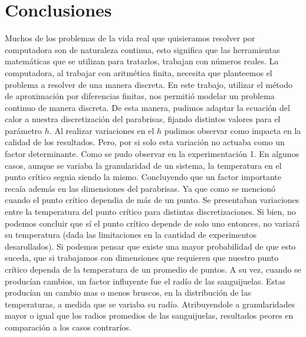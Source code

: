 \section{Conclusiones}
Muchos de los problemas de la vida real que quisieramos resolver por computadora son de naturaleza continua, esto significa que las herramientas matemáticas que se utilizan para tratarlos, trabajan con números reales. La computadora, al trabajar con aritmética finita, necesita que planteemos el problema a resolver de una manera discreta. En este trabajo, utilizar el método de aproximación por diferencias finitas, nos permitió modelar un problema continuo de manera discreta. De esta manera, pudimos adaptar la ecuación del calor a nuestra discretización del parabrisas, fijando distintos valores para el parámetro $h$.\newline
Al realizar variaciones en el $h$ pudimos observar como impacta en la calidad de los resultados. Pero, por si solo esta variación no actuaba como un factor determinante. Como se pudo observar en la experimentación 1. En algunos casos, aunque se variaba la granularidad de un sistema, la temperatura en el punto crítico seguia siendo la mismo. Concluyendo que un factor importante recaía además en las dimensiones del parabrisas. Ya que como se mencionó cuando el punto crítico dependia de más de un punto. Se presentaban variaciones entre la temperatura del punto crítico para distintas discretizaciones. Si bien, no podemos concluir que sí el punto crítico depende de solo uno entonces, no variará su temperatura (dada las limitaciones en la cantidad de experimentos desarollados). Si podemos pensar que existe una mayor probabilidad de que esto suceda, que si trabajamos con dimensiones que requieren que nuestro punto crítico dependa de la temperatura de un promedio de puntos. A su vez, cuando se producían cambios, un factor influyente fue el radío de las sanguijuelas. Estas producían un cambio mas o menos bruscos, en la distribución de las temperaturas, a medida que se variaba su radío. Atribuyendole a granularidades mayor o igual que los radios promedios de las sanguijuelas, resultados peores en comparación a los casos contraríos.  

